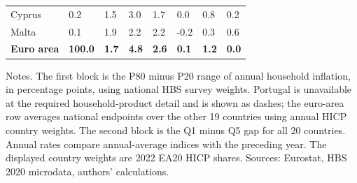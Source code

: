\begin{table}[H]
\begin{tabular}[t]{llllllll}
Cyprus & 0.2 & 1.5 & 3.0 & 1.7 & 0.0 & 0.8 & 0.2\\
Malta & 0.1 & 1.9 & 2.2 & 2.2 & -0.2 & 0.3 & 0.6\\
\addlinespace
\midrule
\textbf{Euro area} & \textbf{100.0} & \textbf{1.7} & \textbf{4.8} & \textbf{2.6} & \textbf{0.1} & \textbf{1.2} & \textbf{0.0}\\
\bottomrule
\end{tabular}
\vspace{-0.4em}
\begin{flushleft}
\footnotesize{Notes. The first block is the P80 minus P20 range of annual household inflation, in percentage points, using national HBS survey weights. Portugal is unavailable at the required household-product detail and is shown as dashes; the euro-area row averages national endpoints over the other 19 countries using annual HICP country weights. The second block is the Q1 minus Q5 gap for all 20 countries. Annual rates compare annual-average indices with the preceding year. The displayed country weights are 2022 EA20 HICP shares. Sources: Eurostat, HBS 2020 microdata, authors' calculations.}
\end{flushleft}
\end{table}
